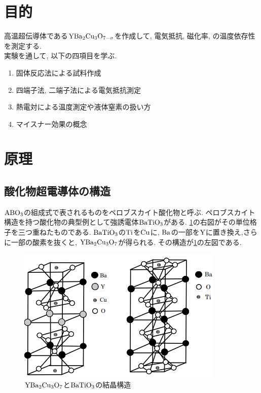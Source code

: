 \documentclass[11pt]{ltjsarticle}
\begin{document}
  \section*{目的}
    高温超伝導体である$\ce{YBa2Cu3O_{7-\sigma}}$を作成して, 電気抵抗, 磁化率, の温度依存性を測定する.\\
    実験を通して, 以下の四項目を学ぶ.
    \begin{enumerate}
      \item 固体反応法による試料作成
      \item 四端子法, 二端子法による電気抵抗測定
      \item 熱電対による温度測定や液体窒素の扱い方
      \item マイスナー効果の概念
    \end{enumerate}
  \section*{原理}
    \subsection*{酸化物超電導体の構造}
      \begin{minipage}[H]{0.48\textwidth}
        $\ce{ABO3}$の組成式で表されるものをペロブスカイト酸化物と呼ぶ. 
        ペロブスカイト構造を持つ酸化物の典型例として強誘電体$\ce{BaTiO3}$がある. \cref{fig:kesshoukouzou}の右図がその単位格子を三つ重ねたものである.
        $\ce{BaTiO3}$の$\ce{Ti}$を$\ce{Cu}$に, $\ce{Ba}$の一部を$\ce{Y}$に置き換え,さらに一部の酸素を抜くと, $\ce{YBa2Cu3O7}$が得られる.
        その構造が\cref{fig:kesshoukouzou}の左図である.
      \end{minipage}
      \hfill
      \begin{minipage}[H]{0.48\textwidth}
        \begin{figure}[H]
          \centering
          \includegraphics[width=\columnwidth]{kesshoukouzou.png}
          \caption{$\ce{YBa2Cu3O7}$と$\ce{BaTiO3}$の結晶構造}
          \label{fig:kesshoukouzou}
        \end{figure}
      \end{minipage}
\end{document}
